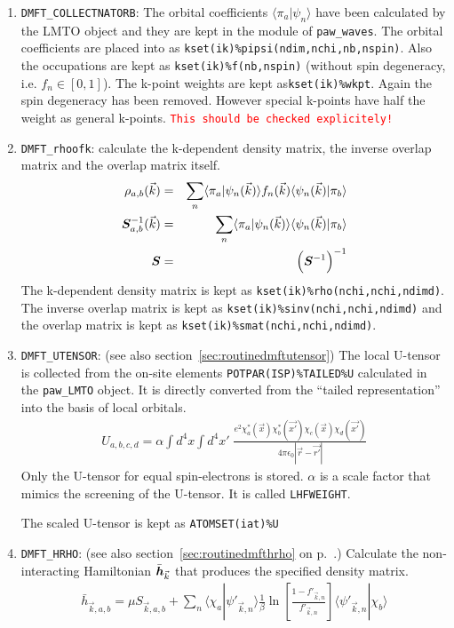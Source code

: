 \documentclass[11pt,a4paper]{report}
\newcommand{\petertt}[1]{\textcolor{red}{\texttt{#1}}}
\begin{document}
\begin{enumerate}
\item \verb|DMFT_COLLECTNATORB|: The orbital coefficients
  $\langle\pi_a|\psi_n\rangle$ have been calculated by the LMTO object
  and they are kept in the module of \verb|paw_waves|.  The orbital
  coefficients are placed into as
  \verb|kset(ik)%pipsi(ndim,nchi,nb,nspin)|. Also the occupations are
  kept as \verb|kset(ik)%f(nb,nspin)| (without spin degeneracy,
  i.e. $f_n\in[0,1]$). The k-point weights are kept
  as\verb|kset(ik)%wkpt|. Again the spin degeneracy has been
  removed. However special k-points have half the weight as general
  k-points. \petertt{This should be checked explicitely!}
%
\item \verb|DMFT_rhoofk|: calculate the k-dependent density matrix,
  the inverse overlap matrix and the overlap matrix itself.
\begin{eqnarray}
\rho_{a,b}(\vec{k})&=&\sum_n
\langle\pi_a|\psi_n(\vec{k})\rangle f_n(\vec{k})
\langle\psi_n(\vec{k})|\pi_b\rangle
\\
\bm{S}^{-1}_{a,b}(\vec{k})&=&\sum_n
\langle\pi_a|\psi_n(\vec{k})\rangle 
\langle\psi_n(\vec{k})|\pi_b\rangle
\\
\bm{S}&=&\Bigl(\bm{S}^{-1}\Bigr)^{-1}
\end{eqnarray}
The k-dependent density matrix is kept as
\verb|kset(ik)%rho(nchi,nchi,ndimd)|. The inverse overlap matrix is
kept as \verb|kset(ik)%sinv(nchi,nchi,ndimd)| and the overlap matrix
is kept as \verb|kset(ik)%smat(nchi,nchi,ndimd)|.
%
\item \verb|DMFT_UTENSOR|: (see also
  section~\ref{sec:routinedmftutensor}) The local U-tensor is
  collected from the on-site elements \verb|POTPAR(ISP)%TAILED%U|
  calculated in the \verb|paw_LMTO| object. It is directly converted
  from the ``tailed representation'' into the basis of local orbitals.
\begin{eqnarray}
U_{a,b,c,d}=\alpha\int d^4x\int d^4x'\;
\frac{e^2\chi^*_a(\vec{x})\chi^*_b(\vec{x'})\chi_c(\vec{x})\chi_d(\vec{x'})}
{4\pi\epsilon_0|\vec{r}-\vec{r'}|}
\label{eq:defutensordmftobject}
\end{eqnarray}
Only the U-tensor for equal spin-electrons is stored. $\alpha$ is a
scale factor that mimics the screening of the U-tensor. It is called
\verb|LHFWEIGHT|.

The scaled U-tensor is kept as \verb|ATOMSET(iat)%U|
%
\item \verb|DMFT_HRHO|: (see also section~\ref{sec:routinedmfthrho} on
p.~\pageref{sec:routinedmfthrho}.) Calculate the non-interacting
Hamiltonian $\bar{\bm{h}}_{\vec{k}}$ that produces the specified
density matrix.
\begin{eqnarray}
\bar{h}_{\vec{k},a,b}=\mu S_{\vec{k},a,b}+\sum_{n}
\langle\chi_a|\psi'_{\vec{k},n}\rangle\frac{1}{\beta}
\ln\left[\frac{1-f'_{\vec{k},n}}{f'_{\vec{k},n}}\right]
\langle\psi'_{\vec{k},n}|\chi_b\rangle
\end{eqnarray}


\end{enumerate}
\end{document}

